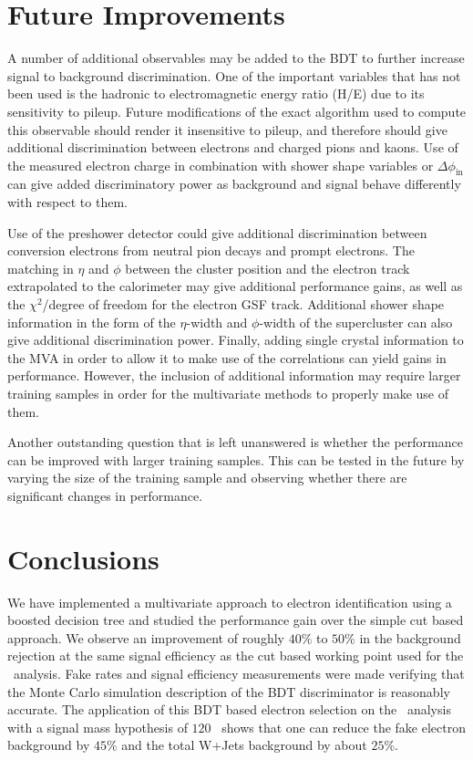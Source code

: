 \documentclass{cmspaper}
\begin{document}
\section{Future Improvements}

A number of additional observables may be added to the BDT to further increase signal to background discrimination. One of the important variables that has not been used is the hadronic to electromagnetic energy ratio (H/E) due to its sensitivity to pileup. Future modifications of the exact algorithm used to compute this observable should render it insensitive to pileup, and therefore should give additional discrimination between electrons and charged pions and kaons. Use of the measured electron charge in combination with shower shape variables or $\Delta \phi_{\mathrm{in}}$ can give added discriminatory power as background and signal behave differently with respect to them. 

Use of the preshower detector could give additional discrimination between conversion electrons from neutral pion decays and prompt electrons. The matching in $\eta$ and $\phi$ between the cluster position and the electron track extrapolated to the calorimeter may give additional performance gains, as well as the $\chi^{2}$/degree of freedom for the electron GSF track. Additional shower shape information in the form of the $\eta$-width and $\phi$-width of the supercluster can also give additional discrimination power. Finally, adding single crystal information to the MVA in order to allow it to make use of the correlations can yield gains in performance. However, the inclusion of additional information may require larger training samples in order for the multivariate methods to properly make use of them.

Another outstanding question that is left unanswered is whether the performance can be improved with larger training samples. This can be tested in the future by varying the size of the training sample and observing whether there are significant changes in performance. 

\section{Conclusions}
  \label{sec:summary}
We have implemented a multivariate approach to electron identification using a boosted decision tree and studied the performance gain over the simple cut based approach. We observe an improvement of roughly $40\%$ to $50\%$ in the background rejection at the same signal efficiency as the cut based working point used for the \hww\ analysis. Fake rates and signal efficiency measurements were made verifying that the Monte Carlo simulation description of the BDT discriminator is reasonably accurate. The application of this BDT based electron selection on the \hww\ analysis with a signal mass hypothesis of $120$ \GeV\ shows that one can reduce the fake electron background by $45\%$ and the total W+Jets background by about $25\%$.
\end{document}

